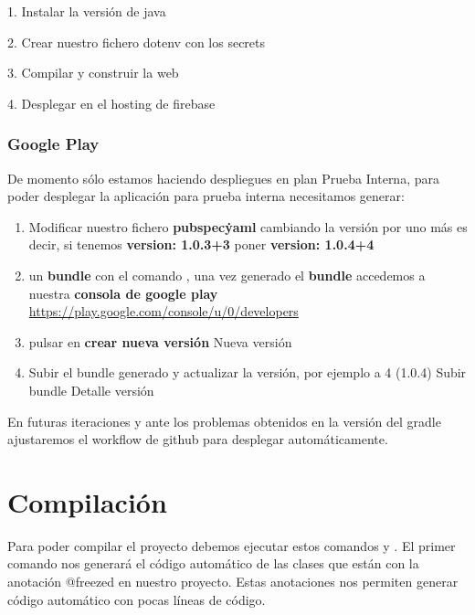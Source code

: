 1. Instalar la versión de java

2. Crear nuestro fichero dotenv con los secrets

3. Compilar y construir la web

4. Desplegar en el hosting de firebase

\subsubsection{Google Play}
De momento sólo estamos haciendo despliegues en plan Prueba Interna, para poder desplegar la aplicación para prueba interna necesitamos generar:
\begin{enumerate}
	\item Modificar nuestro fichero \textbf{pubspec\.yaml} cambiando la versión por uno más es decir, si tenemos \textbf{version: 1.0.3+3} poner \textbf{version: 1.0.4+4}
	\item un \textbf{bundle} con el comando \fboxrule=1pt\fboxsep=4pt, una vez generado el \textbf{bundle} accedemos a nuestra \textbf{consola de google play} \url{https://play.google.com/console/u/0/developers}
	\item pulsar en \textbf{crear nueva versión}
 {Nueva versión}
	\item Subir el bundle generado y actualizar la versión, por ejemplo a 4 (1.0.4)
 {Subir bundle}
 {Detalle versión}
\end{enumerate}

En futuras iteraciones y ante los problemas obtenidos en la versión del gradle ajustaremos el workflow de github para desplegar automáticamente.

\section{Compilación}
Para poder compilar el proyecto debemos ejecutar estos comandos \fboxrule=1pt\fboxsep=4pt y \fboxrule=1pt\fboxsep=4pt. El primer comando nos generará el código automático de las clases que están con la anotación @freezed en nuestro proyecto. Estas anotaciones nos permiten generar código automático con pocas líneas de código.

